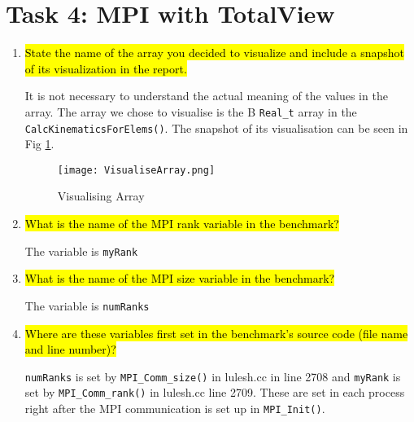\documentclass{article}
\begin{document}
\section{Task 4: MPI with TotalView}
\begin{enumerate}
	\item \hl{State the name of the array you decided to visualize and include a snapshot of its visualization in the report.}
	
	It is not necessary to understand the actual meaning of the values in the array.
	The array we chose to visualise is the B \verb!Real_t! array in the \verb!CalcKinematicsForElems()!. 
	The snapshot of its visualisation can be seen in Fig \ref{fig:visual_array}.
	
			\begin{figure}[p] %
		\begin{center}
			\texttt{[image: VisualiseArray.png]}
		\caption{Visualising Array}
		\label{fig:visual_array}
		\end{center}
	\end{figure}
	
	\item \hl{What is the name of the MPI rank variable in the benchmark?}
	
	The variable is \verb!myRank!
	\item \hl{What is the name of the MPI size variable in the benchmark?}
	
	The variable is \verb!numRanks!
	\item \hl{Where are these variables first set in the benchmark’s source code (file name and line number)?}
	
	\verb!numRanks! is set by \verb!MPI_Comm_size()! in lulesh.cc in line 2708 and \verb!myRank! is set by \verb!MPI_Comm_rank()! in lulesh.cc line 2709. 
	These are set in each process right after the MPI communication is set up in \verb!MPI_Init()!.

\end{enumerate}
\end{document}
